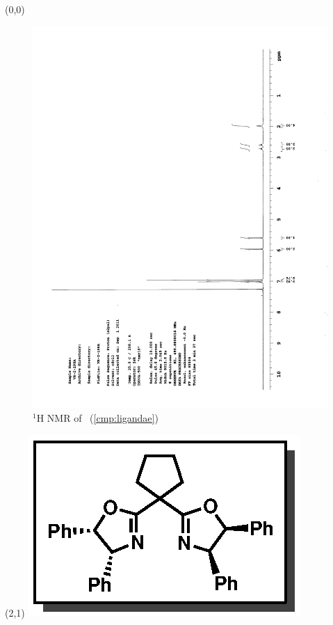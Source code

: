 \begin{textblock}{20}(0,0)
\begin{figure}[htb]
\caption{$^1$H NMR of \CMPligandae\ (\ref{cmp:ligandae})}
\includegraphics[scale=0.75, trim = 0mm 0mm 0mm 5mm,
clip]{chp_asymmetric/images/nmr/ligandaeH}
\vspace{-100pt}
\end{figure}
\end{textblock}
\begin{textblock}{1}(2,1)
\includegraphics[scale=0.8, angle=90]{chp_asymmetric/images/ligandae}
\end{textblock}
